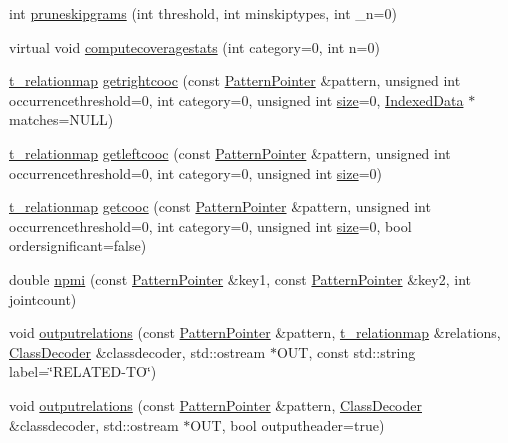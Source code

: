 \begin{DoxyCompactItemize}
\item 
int \hyperlink{classIndexedPatternModel_a812c9e92fbf801545c1596cc5f4cf080}{pruneskipgrams} (int threshold, int minskiptypes, int \+\_\+n=0)
\item 
virtual void \hyperlink{classIndexedPatternModel_a0f0da07b70336e9699accedc2cde5351}{computecoveragestats} (int category=0, int n=0)
\item 
\hyperlink{patternmodel_8h_a8695a2b10be5a74c827cd6c11bd46fb9}{t\+\_\+relationmap} \hyperlink{classIndexedPatternModel_ae49646bf2fafbf9dca7a3a450573f262}{getrightcooc} (const \hyperlink{classPatternPointer}{Pattern\+Pointer} \&pattern, unsigned int occurrencethreshold=0, int category=0, unsigned int \hyperlink{classPatternModel_a2422cb944da209f399b3b10f3b1d2684}{size}=0, \hyperlink{classIndexedData}{Indexed\+Data} $\ast$matches=N\+U\+L\+L)
\item 
\hyperlink{patternmodel_8h_a8695a2b10be5a74c827cd6c11bd46fb9}{t\+\_\+relationmap} \hyperlink{classIndexedPatternModel_a0bb4086eb14053c92ca79bb792611179}{getleftcooc} (const \hyperlink{classPatternPointer}{Pattern\+Pointer} \&pattern, unsigned int occurrencethreshold=0, int category=0, unsigned int \hyperlink{classPatternModel_a2422cb944da209f399b3b10f3b1d2684}{size}=0)
\item 
\hyperlink{patternmodel_8h_a8695a2b10be5a74c827cd6c11bd46fb9}{t\+\_\+relationmap} \hyperlink{classIndexedPatternModel_aa262aa72330822664d2327378603b872}{getcooc} (const \hyperlink{classPatternPointer}{Pattern\+Pointer} \&pattern, unsigned int occurrencethreshold=0, int category=0, unsigned int \hyperlink{classPatternModel_a2422cb944da209f399b3b10f3b1d2684}{size}=0, bool ordersignificant=false)
\item 
double \hyperlink{classIndexedPatternModel_a59db87907763ca11f553eb138c3a8425}{npmi} (const \hyperlink{classPatternPointer}{Pattern\+Pointer} \&key1, const \hyperlink{classPatternPointer}{Pattern\+Pointer} \&key2, int jointcount)
\item 
void \hyperlink{classIndexedPatternModel_aa666827ba3837abe86bf538782abdd96}{outputrelations} (const \hyperlink{classPatternPointer}{Pattern\+Pointer} \&pattern, \hyperlink{patternmodel_8h_a8695a2b10be5a74c827cd6c11bd46fb9}{t\+\_\+relationmap} \&relations, \hyperlink{classClassDecoder}{Class\+Decoder} \&classdecoder, std\+::ostream $\ast$O\+U\+T, const std\+::string label=\char`\"{}R\+E\+L\+A\+T\+E\+D-\/T\+O\char`\"{})
\item 
void \hyperlink{classIndexedPatternModel_a09b446b208f4a013f07828f8650c278e}{outputrelations} (const \hyperlink{classPatternPointer}{Pattern\+Pointer} \&pattern, \hyperlink{classClassDecoder}{Class\+Decoder} \&classdecoder, std\+::ostream $\ast$O\+U\+T, bool outputheader=true)

\end{DoxyCompactItemize}
